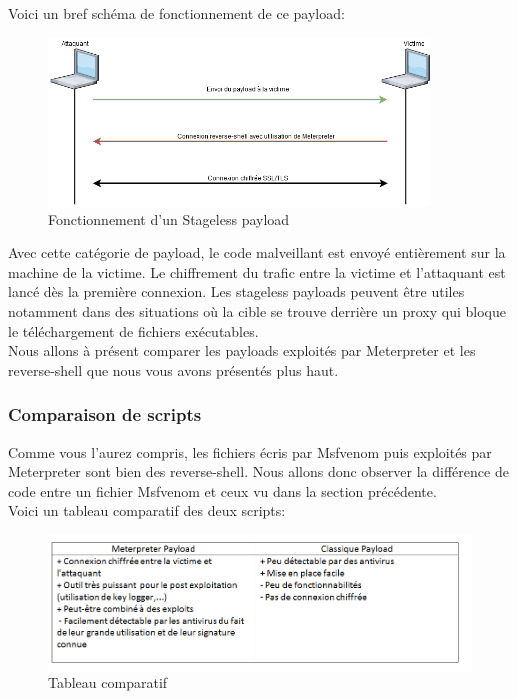 Voici un bref schéma de fonctionnement de ce payload:


\begin{figure}[htp!]
  \centering
  \setlength\figureheight{7cm}
  \setlength\figurewidth{9cm}
  \includegraphics[width=0.9\textwidth]{oui/images/Reverse_shell-meterpreter/Untitled Diagram(4).png}
  \caption{Fonctionnement d'un Stageless payload}
  \label{fig:courbe-tikz}
\end{figure}

\noindent Avec cette catégorie de payload, le code malveillant est envoyé entièrement sur la machine de la victime.
Le chiffrement du trafic entre la victime et l’attaquant est lancé dès la première connexion.
Les stageless payloads peuvent être utiles notamment dans des situations où la cible se trouve derrière un proxy qui bloque le téléchargement de fichiers exécutables.\\
Nous allons à présent comparer les payloads exploités par Meterpreter et les reverse-shell que nous vous avons présentés plus haut.

\subsubsection{Comparaison de scripts}

Comme vous l'aurez compris, les fichiers écris par Msfvenom puis exploités par Meterpreter sont bien des reverse-shell. Nous allons donc observer la différence de code entre un fichier Msfvenom et ceux vu dans la section précédente.\\

Voici un tableau comparatif des deux scripts:

\begin{figure}[htp!]
  \centering
  \setlength\figureheight{7cm}
  \setlength\figurewidth{9cm}
  \includegraphics[width=1\textwidth]{oui/images/Reverse_shell-meterpreter/payload.PNG}
  \caption{Tableau comparatif}
  \label{fig:courbe-tikz}
\end{figure}
